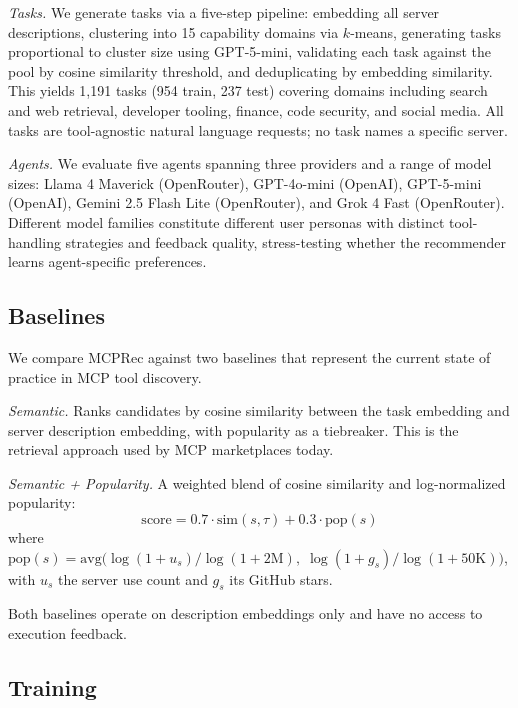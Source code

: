 \documentclass{article} %
\begin{document}
\textit{Tasks.} We generate tasks via a five-step pipeline: embedding all server descriptions, clustering into 15 capability domains via $k$-means, generating tasks proportional to cluster size using GPT-5-mini, validating each task against the pool by cosine similarity threshold, and deduplicating by embedding similarity. This yields 1{,}191 tasks (954 train, 237 test) covering domains including search and web retrieval, developer tooling, finance, code security, and social media. All tasks are tool-agnostic natural language requests; no task names a specific server.

\textit{Agents.} We evaluate five agents spanning three providers and a range of model sizes: Llama 4 Maverick (OpenRouter), GPT-4o-mini (OpenAI), GPT-5-mini (OpenAI), Gemini 2.5 Flash Lite (OpenRouter), and Grok 4 Fast (OpenRouter). Different model families constitute different user personas with distinct tool-handling strategies and feedback quality, stress-testing whether the recommender learns agent-specific preferences.

\subsection{Baselines}
\label{sec:baselines}

We compare MCPRec against two baselines that represent the current state of practice in MCP tool discovery.

\textit{Semantic.} Ranks candidates by cosine similarity between the task embedding and server description embedding, with popularity as a tiebreaker. This is the retrieval approach used by MCP marketplaces today.

\textit{Semantic + Popularity.} A weighted blend of cosine similarity and log-normalized popularity:
\begin{equation}
\label{eq:sempop}
\text{score} = 0.7 \cdot \text{sim}(s, \tau) + 0.3 \cdot \text{pop}(s)
\end{equation}
where $\text{pop}(s) = \text{avg}\!\big(\log(1 + u_s) / \log(1 + 2\text{M}),\; \log(1 + g_s) / \log(1 + 50\text{K})\big)$, with $u_s$ the server use count and $g_s$ its GitHub stars.

Both baselines operate on description embeddings only and have no access to execution feedback.

\subsection{Training}
\label{sec:training}
\end{document}
